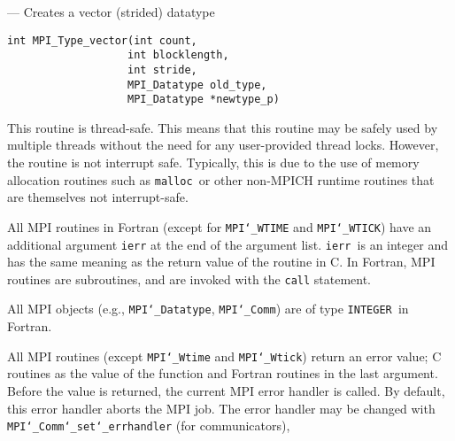\startmanpage
{}
--- Creates a vector (strided) datatype 
\startvb\begin{verbatim}
int MPI_Type_vector(int count,
                   int blocklength,
                   int stride, 
                   MPI_Datatype old_type,
                   MPI_Datatype *newtype_p)

\end{verbatim}
\endvb

\par
{}
\par
{}
\par
This routine is thread-safe.  This means that this routine may be
safely used by multiple threads without the need for any user-provided
thread locks.  However, the routine is not interrupt safe.  Typically,
this is due to the use of memory allocation routines such as {\tt malloc
}or other non-MPICH runtime routines that are themselves not interrupt-safe.
\par
{}
All MPI routines in Fortran (except for {\tt MPI{\tt \char`\_}WTIME} and {\tt MPI{\tt \char`\_}WTICK}) have
an additional argument {\tt ierr} at the end of the argument list.  {\tt ierr
}is an integer and has the same meaning as the return value of the routine
in C.  In Fortran, MPI routines are subroutines, and are invoked with the
{\tt call} statement.
\par
All MPI objects (e.g., {\tt MPI{\tt \char`\_}Datatype}, {\tt MPI{\tt \char`\_}Comm}) are of type {\tt INTEGER
}in Fortran.
\par
{}
\par
All MPI routines (except {\tt MPI{\tt \char`\_}Wtime} and {\tt MPI{\tt \char`\_}Wtick}) return an error value;
C routines as the value of the function and Fortran routines in the last
argument.  Before the value is returned, the current MPI error handler is
called.  By default, this error handler aborts the MPI job.  The error handler
may be changed with {\tt MPI{\tt \char`\_}Comm{\tt \char`\_}set{\tt \char`\_}errhandler} (for communicators),

